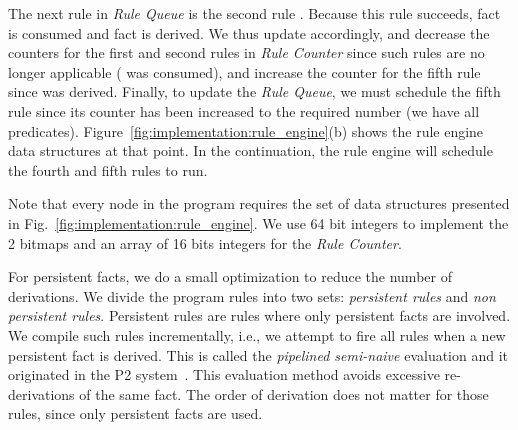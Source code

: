 The next rule in \emph{Rule Queue} is the second rule .  Because
this rule succeeds, fact  is consumed and fact  is derived.  We
thus update  accordingly, and decrease the counters for
the first and second rules in \emph{Rule Counter} since such rules are no longer
applicable ( was consumed), and increase the counter for the fifth rule
since  was derived. Finally, to update the \emph{Rule Queue}, we must
schedule the fifth rule since its counter has been increased to the required
number (we have all predicates).  Figure~\ref{fig:implementation:rule_engine}(b)
shows the rule engine data structures at that point.  In the continuation, the
rule engine will schedule the fourth and fifth rules to run.

Note that every node in the program requires the set of data structures
presented in Fig.~\ref{fig:implementation:rule_engine}. We use 64 bit integers
to implement the 2 bitmaps and an array of 16 bits integers for the \emph{Rule
Counter}.

For persistent facts, we do a small optimization to reduce the number of
derivations. We divide the program rules into two sets: \emph{persistent rules}
and \emph{non persistent rules}. Persistent rules are rules where only
persistent facts are involved. We compile such rules incrementally, i.e., we
attempt to fire all rules when a new persistent fact is derived. This is called
the \emph{pipelined semi-naive} evaluation and it originated in the P2
system~\cite{Loo-condie-garofalakis-p2}. This evaluation method avoids excessive
re-derivations of the same fact. The order of derivation does not matter for
those rules, since only persistent facts are used.


